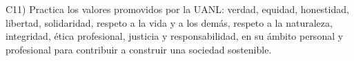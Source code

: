 C11) Practica los valores promovidos por la UANL: verdad, equidad,
honestidad, libertad, solidaridad, respeto a la vida y a los dem\'{a}s,
respeto a la naturaleza, integridad, \'{e}tica profesional, justicia y
responsabilidad, en su \'{a}mbito personal y profesional para contribuir a
construir una sociedad sostenible.
